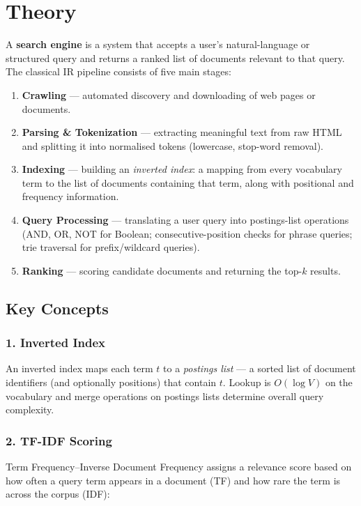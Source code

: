 \documentclass[12pt]{article}
\begin{document}
\section*{Theory}

A \textbf{search engine} is a system that accepts a user's natural-language or structured query and returns a ranked list of documents relevant to that query. The classical IR pipeline consists of five main stages:

\begin{enumerate}
    \item \textbf{Crawling} --- automated discovery and downloading of web pages or documents.
    \item \textbf{Parsing \& Tokenization} --- extracting meaningful text from raw HTML and splitting it into normalised tokens (lowercase, stop-word removal).
    \item \textbf{Indexing} --- building an \emph{inverted index}: a mapping from every vocabulary term to the list of documents containing that term, along with positional and frequency information.
    \item \textbf{Query Processing} --- translating a user query into postings-list operations (AND, OR, NOT for Boolean; consecutive-position checks for phrase queries; trie traversal for prefix/wildcard queries).
    \item \textbf{Ranking} --- scoring candidate documents and returning the top-$k$ results.
\end{enumerate}

\subsection*{Key Concepts}

\subsubsection*{1. Inverted Index}
An inverted index maps each term $t$ to a \emph{postings list} --- a sorted list of document identifiers (and optionally positions) that contain $t$. Lookup is $O(\log V)$ on the vocabulary and merge operations on postings lists determine overall query complexity.

\subsubsection*{2. TF-IDF Scoring}
Term Frequency--Inverse Document Frequency assigns a relevance score based on how often a query term appears in a document (TF) and how rare the term is across the corpus (IDF):
\end{document}
